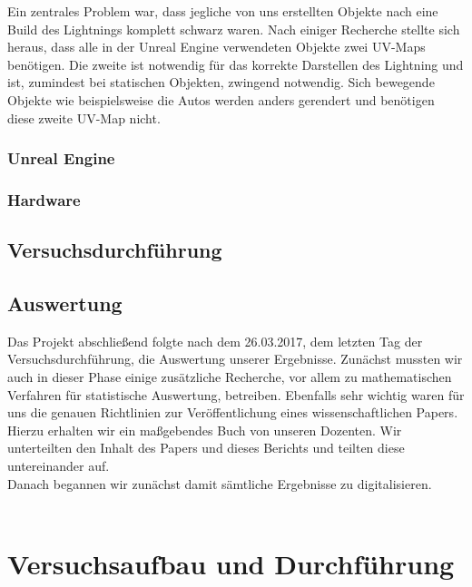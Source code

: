 \documentclass{Bericht}
\begin{document}
			Ein zentrales Problem war, dass jegliche von uns erstellten Objekte nach eine Build des Lightnings komplett schwarz waren. Nach einiger Recherche stellte sich heraus, dass alle in der Unreal Engine verwendeten Objekte zwei UV-Maps benötigen. Die zweite ist notwendig für das korrekte Darstellen des Lightning und ist, zumindest bei statischen Objekten, zwingend notwendig. Sich bewegende Objekte wie beispielsweise die Autos werden anders gerendert und benötigen diese zweite UV-Map nicht. 
		
		\subsubsection{Unreal Engine}
		
		\subsubsection{Hardware}
		

	\subsection{Versuchsdurchführung} %
	\subsection{Auswertung} %
	
		Das Projekt abschließend folgte nach dem 26.03.2017, dem letzten Tag der Versuchsdurchführung, die Auswertung unserer Ergebnisse.
		Zunächst mussten wir auch in dieser Phase einige zusätzliche Recherche, vor allem zu mathematischen Verfahren für statistische Auswertung, betreiben. Ebenfalls sehr wichtig waren für uns die genauen Richtlinien zur Veröffentlichung eines wissenschaftlichen Papers. Hierzu erhalten wir ein maßgebendes Buch von unseren Dozenten. Wir unterteilten den Inhalt des Papers und dieses Berichts und teilten diese untereinander auf.\\
		Danach begannen wir zunächst damit sämtliche Ergebnisse zu digitalisieren.\\
\\

\section{Versuchsaufbau und Durchführung}
\end{document}
